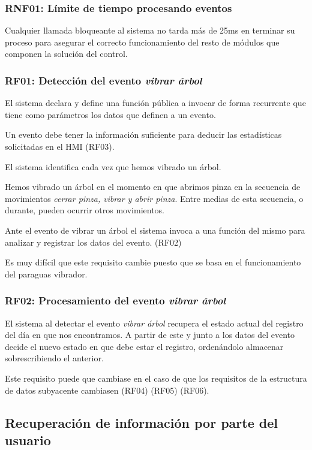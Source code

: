 \subsubsection{RNF01: Límite de tiempo procesando eventos}

Cualquier llamada bloqueante al sistema no tarda más de 25ms
en terminar su proceso para asegurar el correcto funcionamiento del
resto de módulos que componen la solución del control.

\subsubsection{RF01: Detección del evento \textit{vibrar árbol}}

El sistema declara y define una función pública a invocar
de forma recurrente que tiene como parámetros los datos que definen
a un evento.

Un evento debe tener la información suficiente para deducir
las estadísticas solicitadas en el HMI (RF03).

El sistema identifica cada vez que hemos vibrado un árbol.

Hemos vibrado un árbol en el momento en que abrimos pinza en
la secuencia de movimientos \textit{cerrar pinza, vibrar y abrir pinza}.
Entre medias de esta secuencia, o durante, pueden ocurrir otros
movimientos.

Ante el evento de vibrar un árbol el sistema invoca a una función
del mismo para analizar y registrar los datos del evento. (RF02)

Es muy difícil que este requisito cambie puesto que se basa en el
funcionamiento del paraguas vibrador.

\subsubsection{RF02: Procesamiento del evento \textit{vibrar árbol}}

El sistema al detectar el evento \textit{vibrar árbol} recupera
el estado actual del registro del día en que nos encontramos.
A partir de este y junto a los datos del evento decide el nuevo
estado en que debe estar el registro, ordenándolo almacenar
sobrescribiendo el anterior.

Este requisito puede que cambiase en el caso de que los requisitos
de la estructura de datos subyacente cambiasen (RF04) (RF05) (RF06).

\subsection{Recuperación de información por parte del usuario}

